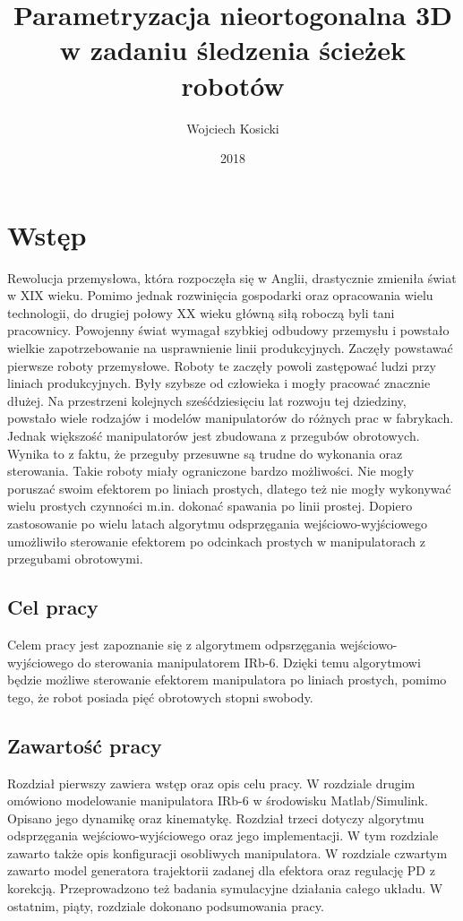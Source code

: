 \documentclass[eng,printmode]{mgr}
\author{Wojciech Kosicki}
\title{Parametryzacja nieortogonalna 3D w zadaniu śledzenia ścieżek robotów}
\date{2018}
\begin{document}
\maketitle


\tableofcontents



\chapter{Wstęp}


Rewolucja przemysłowa, która rozpoczęła się w Anglii,  drastycznie zmieniła świat w XIX wieku. Pomimo jednak rozwinięcia gospodarki oraz opracowania wielu technologii, do drugiej połowy XX wieku główną siłą roboczą byli tani pracownicy. Powojenny świat wymagał szybkiej odbudowy przemysłu i powstało wielkie zapotrzebowanie na usprawnienie linii produkcyjnych. Zaczęły powstawać pierwsze roboty przemysłowe. Roboty te zaczęły powoli zastępować ludzi przy liniach produkcyjnych. Były szybsze od człowieka i mogły pracować znacznie dłużej. Na przestrzeni kolejnych sześćdziesięciu lat rozwoju tej dziedziny, powstało wiele rodzajów i modelów manipulatorów do różnych prac w fabrykach. Jednak większość manipulatorów jest zbudowana z przegubów obrotowych. Wynika to z faktu, że przeguby przesuwne są trudne do wykonania oraz sterowania. Takie roboty miały ograniczone bardzo możliwości. Nie mogły poruszać swoim efektorem po liniach prostych, dlatego też nie mogły wykonywać wielu prostych czynności m.in. dokonać spawania po linii prostej. Dopiero zastosowanie po wielu latach algorytmu odsprzęgania wejściowo-wyjściowego umożliwiło sterowanie efektorem po odcinkach prostych w manipulatorach z przegubami obrotowymi. 
\section{Cel pracy}
Celem pracy jest zapoznanie się z algorytmem odpsrzęgania wejściowo-wyjściowego do sterowania manipulatorem IRb-6. Dzięki temu algorytmowi będzie możliwe sterowanie efektorem manipulatora po liniach prostych, pomimo tego, że robot posiada pięć obrotowych stopni swobody.
\section{Zawartość pracy}
Rozdział pierwszy zawiera wstęp oraz opis celu pracy. W rozdziale drugim omówiono modelowanie manipulatora IRb-6 w środowisku Matlab/Simulink. Opisano jego dynamikę oraz kinematykę. Rozdział trzeci dotyczy algorytmu odsprzęgania wejściowo-wyjściowego oraz jego implementacji. W tym rozdziale zawarto także opis konfiguracji osobliwych manipulatora. W rozdziale czwartym zawarto model generatora trajektorii zadanej dla efektora oraz regulację PD z korekcją. Przeprowadzono też badania symulacyjne działania całego układu. W ostatnim, piąty, rozdziale dokonano podsumowania pracy.
\newpage
\end{document}

